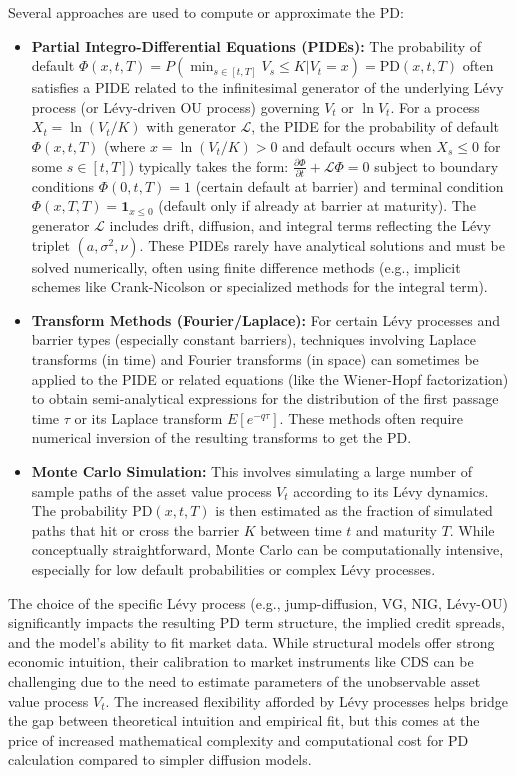 \documentclass[11pt,twoside,openright]{report}
\begin{document}
Several approaches are used to compute or approximate the PD:
\begin{itemize}
    \item \textbf{Partial Integro-Differential Equations (PIDEs):} The probability of default $\Phi(x, t, T) = P(\min_{s \in [t,T]} V_s \le K | V_t = x) = \text{PD}(x, t, T)$ often satisfies a PIDE related to the infinitesimal generator of the underlying Lévy process (or Lévy-driven OU process) governing $V_t$ or $\ln V_t$. For a process $X_t = \ln(V_t / K)$ with generator $\mathcal{L}$, the PIDE for the probability of default $\Phi(x, t, T)$ (where $x = \ln(V_t / K) > 0$ and default occurs when $X_s \le 0$ for some $s \in [t,T]$) typically takes the form: $\frac{\partial \Phi}{\partial t} + \mathcal{L} \Phi = 0$ subject to boundary conditions $\Phi(0, t, T) = 1$ (certain default at barrier) and terminal condition $\Phi(x, T, T) = \mathbf{1}_{x \le 0}$ (default only if already at barrier at maturity). The generator $\mathcal{L}$ includes drift, diffusion, and integral terms reflecting the Lévy triplet $(a, \sigma^2, \nu)$.
    These PIDEs rarely have analytical solutions and must be solved numerically, often using finite difference methods (e.g., implicit schemes like Crank-Nicolson or specialized methods for the integral term).

    \item \textbf{Transform Methods (Fourier/Laplace):} For certain Lévy processes and barrier types (especially constant barriers), techniques involving Laplace transforms (in time) and Fourier transforms (in space) can sometimes be applied to the PIDE or related equations (like the Wiener-Hopf factorization) to obtain semi-analytical expressions for the distribution of the first passage time $\tau$ or its Laplace transform $E[e^{-q\tau}]$. These methods often require numerical inversion of the resulting transforms to get the PD.

    \item \textbf{Monte Carlo Simulation:} This involves simulating a large number of sample paths of the asset value process $V_t$ according to its Lévy dynamics. The probability $\text{PD}(x, t, T)$ is then estimated as the fraction of simulated paths that hit or cross the barrier $K$ between time $t$ and maturity $T$. While conceptually straightforward, Monte Carlo can be computationally intensive, especially for low default probabilities or complex Lévy processes.
\end{itemize}
The choice of the specific Lévy process (e.g., jump-diffusion, VG, NIG, Lévy-OU) significantly impacts the resulting PD term structure, the implied credit spreads, and the model's ability to fit market data. While structural models offer strong economic intuition, their calibration to market instruments like CDS can be challenging due to the need to estimate parameters of the unobservable asset value process $V_t$. The increased flexibility afforded by Lévy processes helps bridge the gap between theoretical intuition and empirical fit, but this comes at the price of increased mathematical complexity and computational cost for PD calculation compared to simpler diffusion models.
\end{document}
